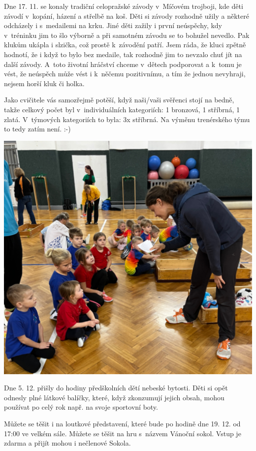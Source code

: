 \documentclass[11pt]{article}
\begin{document}
Dne 17. 11. se konaly tradiční celopražské závody v~Míčovém trojboji, kde děti závodí v~kopání, házení a střelbě na koš. Děti si závody rozhodně užily a některé odcházely i s~medailemi na krku. Jiné děti zažily i první neúspěchy, kdy v~tréninku jim to šlo výborně a při samotném závodu se to bohužel nevedlo. Pak klukům ukápla i slzička, což prostě k~závodění patří. Jsem ráda, že kluci zpětně hodnotí, že i když to bylo bez medaile, tak rozhodně jim to nevzalo chuť jít na další závody. A~toto životní hráčství chceme v~dětech podporovat a k~tomu je vést, že neúspěch může vést i k~něčemu pozitivnímu, a tím že jednou nevyhraji, nejsem horší kluk či holka.

Jako cvičitele vás samozřejmě potěší, když naši/vaši svěřenci stojí na bedně, takže celkový počet byl v~individuálních kategoriích: 1 bronzová, 1 stříbrná, 1 zlatá. V~týmových kategoriích to byla: 3x stříbrná. Na výměnu trenérského týmu to tedy zatím není. :-)

\begin{center}
  \includegraphics*[width=0.7\linewidth]{./PD_zavody.jpg}
\end{center}

Dne 5. 12. přišly do hodiny předškolních dětí nebeské bytosti. Děti si opět odnesly plné látkové balíčky, které, když zkonzumují jejich obsah, mohou používat po celý rok např. na svoje sportovní boty.

Můžete se těšit i na loutkové představení, které bude po hodině dne 19. 12. od 17:00 ve velkém sále. Můžete se těšit na hru s~názvem Vánoční sokol. Vstup je zdarma a přijít mohou i nečlenové Sokola.
                      
\end{document}
